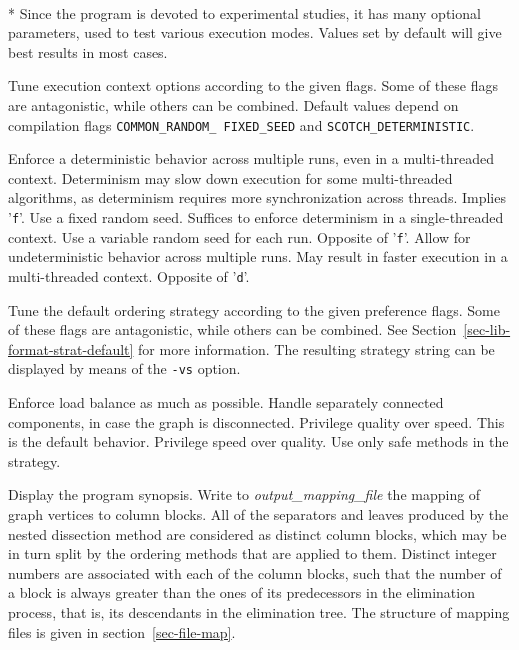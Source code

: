 \begin{itemize}
\progopt\\*
Since the program is devoted to experimental studies, it has many
optional parameters, used to test various execution modes. Values
set by default will give best results in most cases.
\begin{itemize}
Tune execution context options according to the given flags. Some of
these flags are antagonistic, while others can be combined. Default
values depend on compilation flags \texttt{COMMON\_\lbt RANDOM\_\lbt
FIXED\_\lbt SEED} and \texttt{SCOTCH\_\lbt DETERMINISTIC}.
\begin{itemize}
\iteme[\texttt{d}]
Enforce a deterministic behavior across multiple runs, even in a
multi-threaded context. Determinism may slow down execution for some
multi-threaded algorithms, as determinism requires more
synchronization across threads. Implies '\texttt{f}'.
\iteme[\texttt{f}]
Use a fixed random seed. Suffices to enforce determinism in a
single-threaded context.
\iteme[\texttt{r}]
Use a variable random seed for each run. Opposite of '\texttt{f}'.
\iteme[\texttt{u}]
Allow for undeterministic behavior across multiple runs. May result in
faster execution in a multi-threaded context. Opposite of '\texttt{d}'.
\end{itemize}
Tune the default ordering strategy according to the given preference
flags. Some of these flags are antagonistic, while others can be
combined. See Section~\ref{sec-lib-format-strat-default} for more
information. The resulting strategy string can be displayed by means
of the \texttt{-vs} option.
\begin{itemize}
\iteme[\texttt{b}]
Enforce load balance as much as possible.
\iteme[\texttt{d}]
Handle separately connected components, in case the graph is disconnected.
\iteme[\texttt{q}]
Privilege quality over speed. This is the default behavior.
\iteme[\texttt{s}]
Privilege speed over quality.
\iteme[\texttt{t}]
Use only safe methods in the strategy.
\end{itemize}
\iteme[\texttt{-h}]
Display the program synopsis.
Write to {\it output\_mapping\_file\/} the mapping of graph vertices to
column blocks. All of the separators and leaves produced by the nested
dissection method are considered as distinct column blocks, which may
be in turn split by the ordering methods that are applied to them.
Distinct integer numbers are associated with each of the column blocks,
such that the number of a block is always greater than the ones of its
predecessors in the elimination process, that is, its descendants in the
elimination tree.
The structure of mapping files is given in section~\ref{sec-file-map}.


\end{itemize}
\end{itemize}
